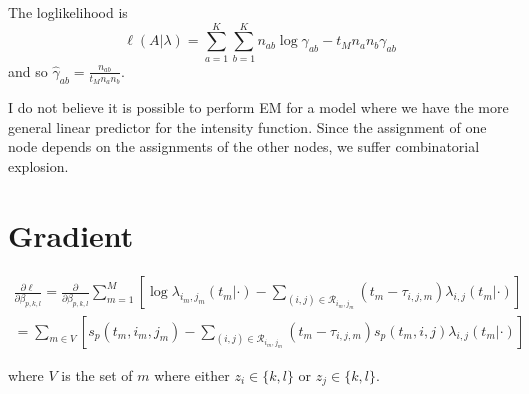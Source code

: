 \documentclass[11pt]{article}
\begin{document}
The loglikelihood is $$\ell(A|\lambda) = \sum_{a=1}^K \sum_{b=1}^K n_{ab} \log \gamma_{ab} - t_M n_a n_b \gamma_{ab}$$
and so $\hat{\gamma}_{ab} = \frac{n_{ab}}{t_Mn_an_b}$.


I do not believe it is possible to perform EM for a model where we have the more general linear predictor for the intensity function.  Since the assignment of one node depends on the assignments of the other nodes, we suffer combinatorial explosion.

\section{Gradient}

\begin{align*}
\frac{\partial \ell}{\partial \beta_{p,k,l}} = \frac{\partial}{\partial \beta_{p,k,l}} \sum_{m = 1}^M \left[ \log \lambda_{i_m,j_m}(t_m | \cdot) - \sum_{(i,j) \in \mathcal{R}_{i_m,j_m}} (t_m-\tau_{i,j,m}) \lambda_{i,j}(t_m|\cdot) \right] \\ 
  =\sum_{m \in V} \left[ s_p(t_m,i_m,j_m) - \sum_{(i,j) \in \mathcal{R}_{i_m,j_m}} (t_m-\tau_{i,j,m}) s_p(t_m,i,j) \lambda_{i,j}(t_m|\cdot) \right]
\end{align*}

where $V$ is the set of $m$ where either $z_i \in \{k,l\}$ or $z_j \in \{k,l\}$.



\end{document}
